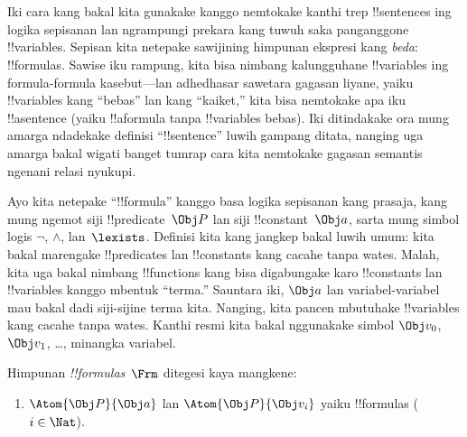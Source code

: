\documentclass[../../../include/open-logic-section]{subfiles}
\begin{document}

\section{}

Iki cara kang bakal kita gunakake kanggo nemtokake kanthi trep
!!{sentence}s ing logika sepisanan lan ngrampungi prekara kang tuwuh
saka panganggone !!{variable}s. Sepisan kita netepake sawijining
himpunan ekspresi kang \emph{beda}: !!{formula}s. Sawise iku rampung,
kita bisa nimbang kalungguhane !!{variable}s ing formula-formula
kasebut---lan adhedhasar sawetara gagasan liyane, yaiku !!{variable}s
kang ``bebas'' lan kang ``kaiket,'' kita bisa nemtokake apa iku
!!a{sentence} (yaiku !!a{formula} tanpa !!{variable}s bebas). Iki
ditindakake ora mung amarga ndadekake definisi ``!!{sentence}'' luwih
gampang ditata, nanging uga amarga bakal wigati banget tumrap cara kita
nemtokake gagasan semantis ngenani relasi nyukupi.

Ayo kita netepake ``!!{formula}'' kanggo basa logika sepisanan kang
prasaja, kang mung ngemot siji !!{predicate}~$\Obj P$ lan siji
!!{constant}~$\Obj a$, sarta mung simbol logis $\lnot$, $\land$,
lan~$\lexists$. Definisi kita kang jangkep bakal luwih umum:
kita bakal marengake !!{predicate}s lan !!{constant}s kang cacahe tanpa
wates. Malah, kita uga bakal nimbang !!{function}s kang bisa digabungake
karo !!{constant}s lan !!{variable}s kanggo mbentuk ``terma.'' Sauntara
iki, $\Obj a$ lan variabel-variabel mau bakal dadi siji-sijine terma
kita. Nanging, kita pancen mbutuhake !!{variable}s kang cacahe tanpa
wates. Kanthi resmi kita bakal nggunakake simbol $\Obj v_0$, $\Obj
v_1$, \dots, minangka variabel.

\begin{defn}
Himpunan \emph{!!{formula}s}~$\Frm$ ditegesi kaya mangkene:
\begin{enumerate}
\item{} $\Atom{\Obj P}{\Obj a}$ lan $\Atom{\Obj
  P}{\Obj v_i}$ yaiku !!{formula}s ($i \in \Nat$).




\end{enumerate}
\end{defn}
\end{document}
